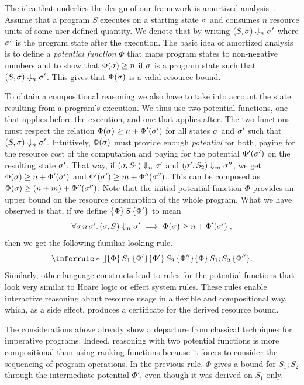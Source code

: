 \documentclass[nocopyrightspace,preprint]{sigplanconf}
\begin{document}
The idea that underlies the design of our framework is amortized
analysis~\cite{Tarjan-amort}.  Assume that a program $S$ executes
on a starting state $\sigma$ and consumes $n$ resource units of
some user-defined quantity.  We denote that by writing $(S, \sigma)
\Downarrow_n \sigma'$ where $\sigma'$ is the program state after
the execution.  The basic idea of amortized analysis is to define a
\emph{potential function} $\Phi$ that maps program states to non-negative
numbers and to show that $\Phi(\sigma) \geq n$ if $\sigma$ is a program
state such that $(S, \sigma) \Downarrow_n \sigma'$.  This gives that
$\Phi(\sigma)$ is a valid resource bound.

To obtain a compositional reasoning we also have to take into account the
state resulting from a program's execution.  We thus use two potential
functions, one that applies before the execution, and one that applies
after.  The two functions must respect the relation $\Phi(\sigma)
\ge n + \Phi'(\sigma')$ for all states $\sigma$ and $\sigma'$ such
that $(S, \sigma) \Downarrow_n \sigma'$.  Intuitively, $\Phi(\sigma)$
must provide enough \emph{potential} for both, paying for the resource
cost of the computation and paying for the potential $\Phi'(\sigma')$ on
the resulting state $\sigma'$. That way, if $(\sigma, S_1) \Downarrow_n
\sigma'$ and $(\sigma', S_2) \Downarrow_m \sigma''$, we get $\Phi(\sigma)
\ge n + \Phi'(\sigma')$ and $\Phi'(\sigma') \ge m + \Phi''(\sigma'')$.
This can be composed as $\Phi(\sigma) \ge (n + m) + \Phi''(\sigma'')$.
Note that the initial potential function $\Phi$ provides an upper bound
on the resource consumption of the whole program.  What we have observed
is that, if we define $\{\Phi\}\, S\, \{\Phi'\}$ to mean
$$
\forall \sigma\, n\, \sigma'.\, (\sigma, S) \Downarrow_n \sigma' \implies \Phi(\sigma) \ge
n + \Phi'(\sigma') \; ,
$$
then we get the following familiar looking rule.
$$
\RuleNolabel
{\htriple{\Phi}{S_1}{\Phi'} \\ \htriple{\Phi'}{S_2}{\Phi''}}
{\htriple{\Phi} {S_1; S_2}  {\Phi''}}.
$$
%
Similarly, other language constructs lead to rules for the potential
functions that look very similar to Hoare logic or effect system
rules.  These rules enable interactive reasoning about resource usage
in a flexible and compositional way, which, as a side effect, produces
a certificate for the derived resource bound.

The considerations above already show a departure from classical
techniques for imperative programs.  Indeed, reasoning with two
potential functions is more compositional than using
ranking-functions because it forces to consider the sequencing of program
operations.  In the previous rule, $\Phi$ gives a bound for
$S_1; S_2$ through the intermediate potential $\Phi'$, even though
it was derived on $S_1$ only.
\end{document}

